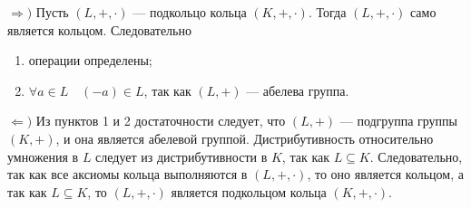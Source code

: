 \begin{Proof}
	$\Rightarrow)$  Пусть $(L, +, \cdot)$ --- подкольцо кольца $(K, +, \cdot)$. Тогда $(L, +, \cdot)$ само является кольцом. Следовательно\begin{enumerate}
		\item операции определены;
		\item $\forall a \in L\quad (-a) \in L$, так как $(L, +)$ --- абелева группа.
	\end{enumerate}
	$\Leftarrow)$ Из пунктов 1 и 2 достаточности следует, что $(L, +)$ --- подгруппа группы $(K, +)$, и она является абелевой группой.
	Дистрибутивность относительно умножения в $L$ следует из дистрибутивности в $K$, так как $L\subseteq K$. Следовательно, так как все аксиомы кольца
	выполняются в $(L, +, \cdot)$, то оно является кольцом, а так как $L\subseteq K$, то $(L, +, \cdot)$ является подкольцом кольца $(K, +, \cdot)$. 
\end{Proof}
